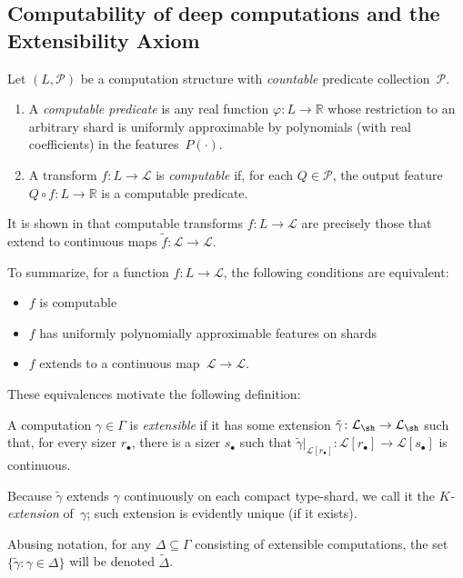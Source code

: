 \subsection{Computability of deep computations and the Extensibility Axiom}
Let $(L, \mathcal{P})$ be a computation structure with \emph{countable} predicate collection~$\mathcal{P}$.

\begin{enumerate}
\item A \emph{computable predicate} is any real function $\varphi\colon L\to \mathbb{R}$ whose restriction to an arbitrary shard is uniformly approximable by polynomials (with real coefficients) in the features~$P(\cdot)$.
\item A transform $f\colon L\to \mathcal{L}$ is \emph{computable} if, for each $Q\in\mathcal{P}$, the output feature $Q{\circ}f\colon L\to\mathbb{R}$ is a computable predicate.
\end{enumerate}

It is shown in \cite{alva2024approximability} that computable transforms $f\colon L\to\mathcal{L}$ are precisely those that extend to continuous maps $\tilde{f}\colon \mathcal{L} \to \mathcal{L}$.

To summarize, for a function $f\colon L\to \mathcal{L}$, the following conditions are equivalent:

\begin{itemize}
    \item $f$ is computable
    \item $f$ has uniformly polynomially approximable features on shards
    \item $f$ extends to a continuous map~$\mathcal{L}\to \mathcal{L}$.
\end{itemize}

These equivalences motivate the following definition:

A computation $\gamma\in \Gamma$ is \emph{extensible} if it has some extension $\tilde\gamma\colon\mathcal{L}_{\sh}\to\mathcal{L}_{\sh}$ such that, for every sizer $r_{\bullet}$, there is a sizer $s_\bullet$ such that $\tilde\gamma|_{\mathcal{L}[r_\bullet]}\colon\mathcal{L}[r_\bullet]\to\mathcal{L}[s_\bullet]$ is continuous.

Because $\tilde{\gamma}$ extends $\gamma$ continuously on each compact type-shard, we call it the \emph{$K$-extension} of~$\gamma$; such extension is evidently unique (if it exists).

Abusing notation, for any $\Delta\subseteq\Gamma$ consisting of extensible computations, the set $\{\tilde\gamma\colon\gamma\in\Delta\}$ will be denoted $\tilde{\Delta}$.

